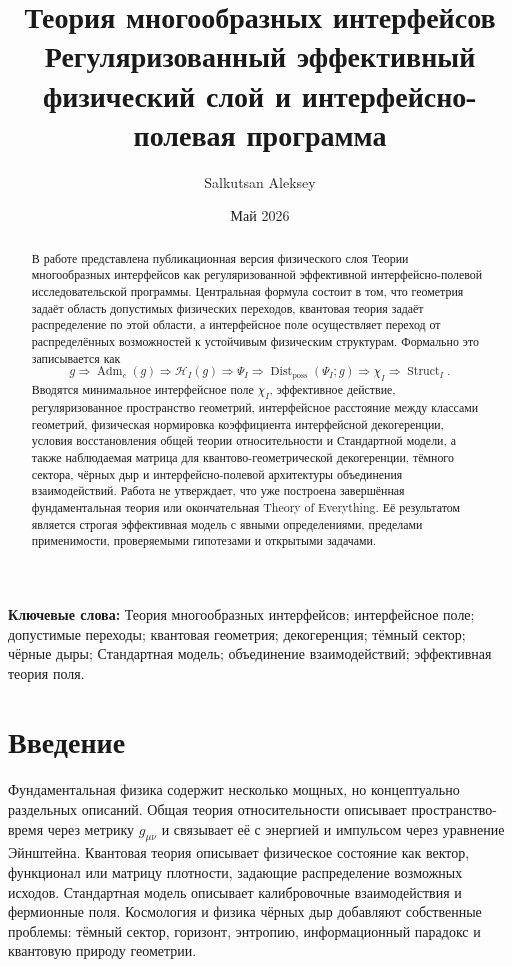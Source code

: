 \documentclass[12pt,a4paper]{article}
\title{\textbf{Теория многообразных интерфейсов}\\
\large Регуляризованный эффективный физический слой и интерфейсно-полевая программа}
\author{Salkutsan Aleksey}
\date{Май 2026}
\DeclareMathOperator{\Adm}{Adm}
\DeclareMathOperator{\Struct}{Struct}
\DeclareMathOperator{\Dist}{Dist}
\newcommand{\Hilb}{\mathcal H}
\begin{document}
\maketitle

\begin{abstract}
В работе представлена публикационная версия физического слоя Теории многообразных интерфейсов как регуляризованной эффективной интерфейсно-полевой исследовательской программы. Центральная формула состоит в том, что геометрия задаёт область допустимых физических переходов, квантовая теория задаёт распределение по этой области, а интерфейсное поле осуществляет переход от распределённых возможностей к устойчивым физическим структурам. Формально это записывается как
\[
 g\Rightarrow\Adm_c(g)\Rightarrow\Hilb_I(g)\Rightarrow\Psi_I
 \Rightarrow\Dist_{\mathrm{poss}}(\Psi_I;g)\Rightarrow\chi_I\Rightarrow\Struct_I.
\]
Вводятся минимальное интерфейсное поле $\chi_I$, эффективное действие, регуляризованное пространство геометрий, интерфейсное расстояние между классами геометрий, физическая нормировка коэффициента интерфейсной декогеренции, условия восстановления общей теории относительности и Стандартной модели, а также наблюдаемая матрица для квантово-геометрической декогеренции, тёмного сектора, чёрных дыр и интерфейсно-полевой архитектуры объединения взаимодействий. Работа не утверждает, что уже построена завершённая фундаментальная теория или окончательная Theory of Everything. Её результатом является строгая эффективная модель с явными определениями, пределами применимости, проверяемыми гипотезами и открытыми задачами.
\end{abstract}

\noindent\textbf{Ключевые слова:} Теория многообразных интерфейсов; интерфейсное поле; допустимые переходы; квантовая геометрия; декогеренция; тёмный сектор; чёрные дыры; Стандартная модель; объединение взаимодействий; эффективная теория поля.

\tableofcontents
\newpage

\section{Введение}
Фундаментальная физика содержит несколько мощных, но концептуально раздельных описаний. Общая теория относительности описывает пространство-время через метрику $g_{\mu\nu}$ и связывает её с энергией и импульсом через уравнение Эйнштейна. Квантовая теория описывает физическое состояние как вектор, функционал или матрицу плотности, задающие распределение возможных исходов. Стандартная модель описывает калибровочные взаимодействия и фермионные поля. Космология и физика чёрных дыр добавляют собственные проблемы: тёмный сектор, горизонт, энтропию, информационный парадокс и квантовую природу геометрии.
\end{document}
